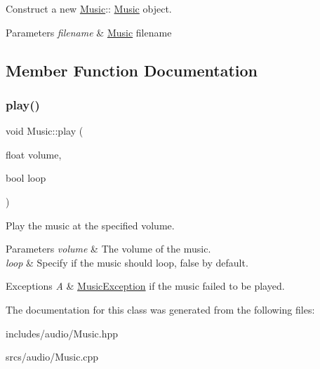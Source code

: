 Construct a new \hyperlink{class_music}{Music}\+:\+: \hyperlink{class_music}{Music} object. 


\begin{DoxyParams}{Parameters}
{\em filename} & \hyperlink{class_music}{Music} filename \\
\hline
\end{DoxyParams}


\subsection{Member Function Documentation}
\mbox{\label{class_music_a5ab263243b34b3f84e916b7b15854df5}} 
\subsubsection{\texorpdfstring{play()}{play()}}
{\footnotesize\ttfamily void Music\+::play (\begin{DoxyParamCaption}\item[{float}]{volume,  }\item[{bool}]{loop }\end{DoxyParamCaption})}



Play the music at the specified volume. 


\begin{DoxyParams}{Parameters}
{\em volume} & The volume of the music. \\
\hline
{\em loop} & Specify if the music should loop, false by default.\\
\hline
\end{DoxyParams}

\begin{DoxyExceptions}{Exceptions}
{\em A} & \hyperlink{class_music_1_1_music_exception}{Music\+Exception} if the music failed to be played. \\
\hline
\end{DoxyExceptions}


The documentation for this class was generated from the following files\+:\begin{DoxyCompactItemize}
\item 
includes/audio/Music.\+hpp\item 
srcs/audio/Music.\+cpp\end{DoxyCompactItemize}
